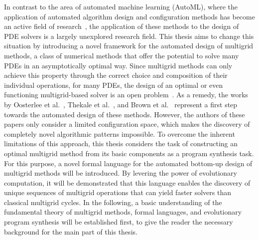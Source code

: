 In contrast to the area of automated machine learning (AutoML), where the application of automated algorithm design and configuration methods has become an active field of research~\cite{ren2021comprehensive,hutter2019automated,elsken2019neural,he2021automl,schrodi2022towards}, the application of these methods to the design of PDE solvers is a largely unexplored research field.
This thesis aims to change this situation by introducing a novel framework for the automated design of multigrid methods, a class of numerical methods that offer the potential to solve many PDEs in an asymptotically optimal way.
Since multigrid methods can only achieve this property through the correct choice and composition of their individual operations, for many PDEs, the design of an optimal or even functioning multigrid-based solver is an open problem~\cite{trottenberg2000multigrid,ernst2012difficult}.
As a remedy, the works by Oosterlee et al.~\cite{oosterlee2003genetic}, Thekale et al.~\cite{thekale2010optimizing}, and Brown et al.~\cite{brown2021tuning} represent a first step towards the automated design of these methods.
However, the authors of these papers only consider a limited configuration space, which makes the discovery of completely novel algorithmic patterns impossible.
To overcome the inherent limitations of this approach, this thesis considers the task of constructing an optimal multigrid method from its basic components as a program synthesis task.
For this purpose, a novel formal language for the automated bottom-up design of multigrid methods will be introduced.
By levering the power of evolutionary computation, it will be demonstrated that this language enables the discovery of unique sequences of multigrid operations that can yield faster solvers than classical multigrid cycles.
In the following, a basic understanding of the fundamental theory of multigrid methods, formal languages, and evolutionary program synthesis will be established first, to give the reader the necessary background for the main part of this thesis.
